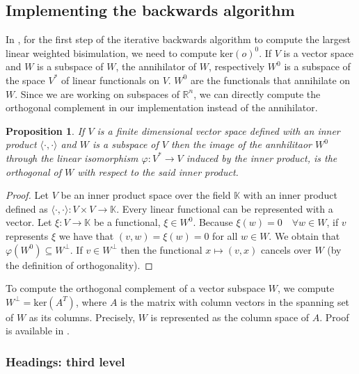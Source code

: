 \documentclass{article}
\theoremstyle{plain}%
\newtheorem{prop}[thm]{Proposition}
\theoremstyle{definition}
\theoremstyle{remark}
\def\R{\mathbb{R}}
\def\K{\mathbb{K}}
\newcommand{\mker}[1]{\text{ker}\left(#1\right)}
\begin{document}
\subsection{Implementing the backwards algorithm}

In \cite{BONCHI201277}, for the first step of the iterative backwards 
algorithm to compute the largest linear weighted bisimulation, we 
need to compute $\mker{o}^0$. If $V$ is a vector space and $W$ is a
subspace of $W$, the annihilator of $W$, respectively $W^0$ is 
a subspace of the space $V^*$ of linear functionals on $V$.
$W^0$ are the functionals that annihilate on $W$. Since 
we are working on subspaces of $\R^n$, we can directly compute 
the orthogonal complement in our implementation instead of the
annihilator.


\begin{prop}
  If $V$ is a finite dimensional vector space defined with an inner product
  $\langle \cdot , \cdot \rangle$ and $W$ is a subspace of $V$
  then the image of the annhilitaor $W^0$ through the linear 
  isomorphism $\varphi: V^* \to V$ induced by the inner product, 
  is the orthogonal of $W$ with respect to the said inner product.
\end{prop}

\begin{proof}
  Let $V$ be an inner product space over the field $\K$ with an inner product defined as
  $\langle \cdot , \cdot \rangle : V \times V \to \K$. 
  Every linear functional can be 
  represented with a vector. Let $\xi : V \to \K$ be a functional, 
  $\xi \in  W^0$. Because $\xi(w)=0 \quad \forall  w \in W$, 
  if $v$ represents $\xi$ we have that $(v, w)=\xi(w)=0$ for all $w \in W$. 
  We obtain that $\varphi(W^0) \subseteq W^{\perp}$.
  If $v \in W^\perp$  
  then the functional $x \mapsto (v, x)$ cancels over $W$ 
  (by the definition of orthogonality).
\end{proof}


To compute the orthogonal complement of a vector subspace $W$, we
compute $W^\perp = \mker{A^T}$, where $A$ is the matrix with 
column vectors in the spanning set of $W$ as its columns. Precisely, $W$ is 
represented as the 
column space of $A$. Proof is available in \cite{ila}.



\subsubsection{Headings: third level}
\end{document}

